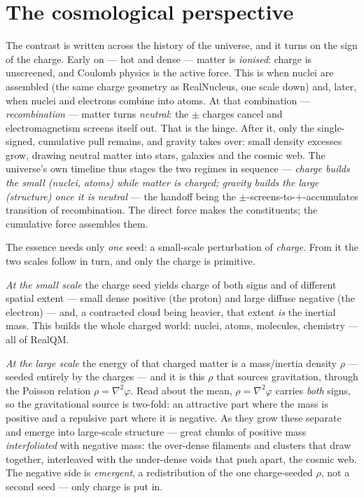 \documentclass[11pt]{article}
\begin{document}
\section{The cosmological perspective}
The contrast is written across the history of the universe, and it turns on the sign of the charge. Early on ---
hot and dense --- matter is \emph{ionised}: charge is unscreened, and Coulomb physics is the active force. This is
when nuclei are assembled (the same charge geometry as RealNucleus, one scale down) and, later, when nuclei and
electrons combine into atoms. At that combination --- \emph{recombination} --- matter turns \emph{neutral}: the
$\pm$ charges cancel and electromagnetism screens itself out. That is the hinge. After it, only the single-signed,
cumulative pull remains, and gravity takes over: small density excesses grow, drawing neutral matter into stars,
galaxies and the cosmic web. The universe's own timeline thus stages the two regimes in sequence --- \emph{charge
builds the small (nuclei, atoms) while matter is charged; gravity builds the large (structure) once it is
neutral} --- the handoff being the $\pm$-screens-to-$+$-accumulates transition of recombination. The direct force
makes the constituents; the cumulative force assembles them.

The essence needs only \emph{one} seed: a small-scale perturbation of \emph{charge}. From it the two scales follow
in turn, and only the charge is primitive.

\emph{At the small scale} the charge seed yields charge of both signs and of different spatial extent --- small
dense positive (the proton) and large diffuse negative (the electron) --- and, a contracted cloud being heavier,
that extent \emph{is} the inertial mass. This builds the whole charged world: nuclei, atoms, molecules, chemistry
--- all of RealQM.

\emph{At the large scale} the energy of that charged matter is a mass/inertia density $\rho$ --- seeded entirely by
the charges --- and it is this $\rho$ that sources gravitation, through the Poisson relation $\rho=\nabla^2\varphi$.
Read about the mean, $\rho=\nabla^2\varphi$ carries \emph{both} signs, so the gravitational source is two-fold: an
attractive part where the mass is positive and a repulsive part where it is negative. As they grow these separate
and emerge into large-scale structure --- great chunks of positive mass \emph{interfoliated} with negative mass:
the over-dense filaments and clusters that draw together, interleaved with the under-dense voids that push apart,
the cosmic web. The negative side is \emph{emergent}, a redistribution of the one charge-seeded $\rho$, not a second
seed --- only charge is put in.
\end{document}
